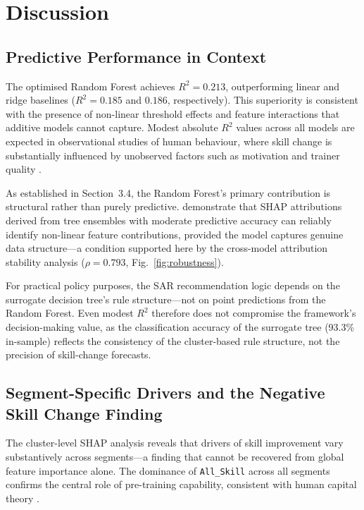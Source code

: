 \documentclass[3p,twocolumn,authoryear]{elsarticle}
\begin{document}
\section{Discussion}

\subsection{Predictive Performance in Context}

The optimised Random Forest achieves $R^{2} = 0.213$, outperforming
linear and ridge baselines ($R^{2} = 0.185$ and $0.186$, respectively).
This superiority is consistent with the presence of non-linear threshold
effects and feature interactions that additive models cannot capture.
Modest absolute $R^{2}$ values across all models are expected in
observational studies of human behaviour, where skill change is
substantially influenced by unobserved factors such as motivation and
trainer quality \citep{davis2012}.

As established in Section~3.4, the Random Forest's primary contribution
is structural rather than purely predictive.
\citet{lundberg2020} demonstrate that SHAP attributions derived from
tree ensembles with moderate predictive accuracy can reliably identify
non-linear feature contributions, provided the model captures genuine
data structure---a condition supported here by the cross-model
attribution stability analysis ($\rho = 0.793$,
Fig.~\ref{fig:robustness}).

For practical policy purposes, the SAR recommendation logic depends on
the surrogate decision tree's rule structure---not on point predictions
from the Random Forest.
Even modest $R^{2}$ therefore does not compromise the framework's
decision-making value, as the classification accuracy of the surrogate
tree (93.3\% in-sample) reflects the consistency of the cluster-based
rule structure, not the precision of skill-change forecasts.

\subsection{Segment-Specific Drivers and the Negative Skill Change
            Finding}

The cluster-level SHAP analysis reveals that drivers of skill improvement
vary substantively across segments---a finding that cannot be recovered
from global feature importance alone.
The dominance of \texttt{All\_Skill} across all segments confirms the
central role of pre-training capability, consistent with human capital
theory \citep{feder1985,davis2012}.
\end{document}
